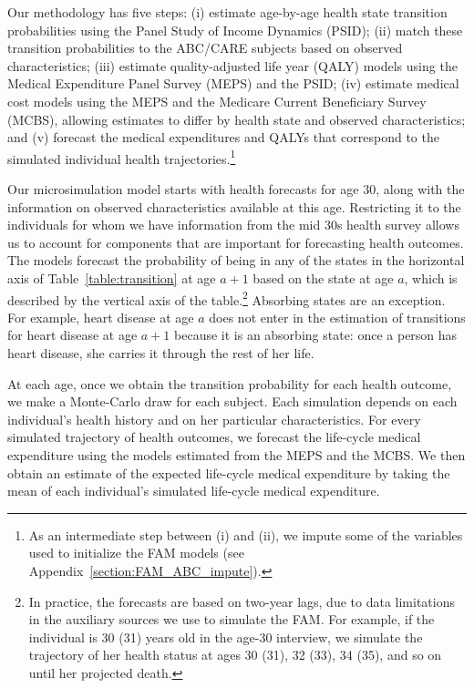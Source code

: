 Our methodology has five steps: (i) estimate age-by-age health state transition probabilities using the Panel Study of Income Dynamics (PSID); (ii) match these transition probabilities to the ABC/CARE subjects based on observed characteristics; (iii) estimate quality-adjusted life year (QALY) models using the Medical Expenditure Panel Survey (MEPS) and the PSID; (iv) estimate medical cost models using the MEPS and the Medicare Current Beneficiary Survey (MCBS), allowing estimates to differ by health state and observed characteristics; and (v) forecast the medical expenditures and QALYs that correspond to the simulated individual health trajectories.\footnote{As an intermediate step between (i) and (ii), we impute some of the variables used to initialize the FAM models (see  Appendix~\ref{section:FAM_ABC_impute}).}

Our microsimulation model starts with health forecasts for age 30, along with the information on observed characteristics available at this age. Restricting it to the individuals for whom we have information from the mid 30s health survey allows us to account for components that are important for forecasting health outcomes. The models forecast the probability of being in any of the states in the horizontal axis of Table~\ref{table:transition} at age $a+1$ based on the state at age $a$, which is described by the vertical axis of the table.\footnote{In practice, the forecasts are based on two-year lags, due to data limitations in the auxiliary sources we use to simulate the FAM. For example, if the individual is 30 (31) years old in the age-30 interview, we simulate the trajectory of her health status at ages 30 (31), 32 (33), 34 (35), and so on until her projected death.} Absorbing states are an exception. For example, heart disease at age $a$ does not enter in the estimation of transitions for heart disease at age $a+1$ because it is an absorbing state: once a person has heart disease, she carries it through the rest of her life.

At each age, once we obtain the transition probability for each health outcome, we make a Monte-Carlo draw for each subject. Each simulation depends on each individual's health history and on her particular characteristics. For every simulated trajectory of health outcomes, we forecast the life-cycle medical expenditure using the models estimated from the MEPS and the MCBS. We then obtain an estimate of the expected life-cycle medical expenditure by taking the mean of each individual's simulated life-cycle medical expenditure.

